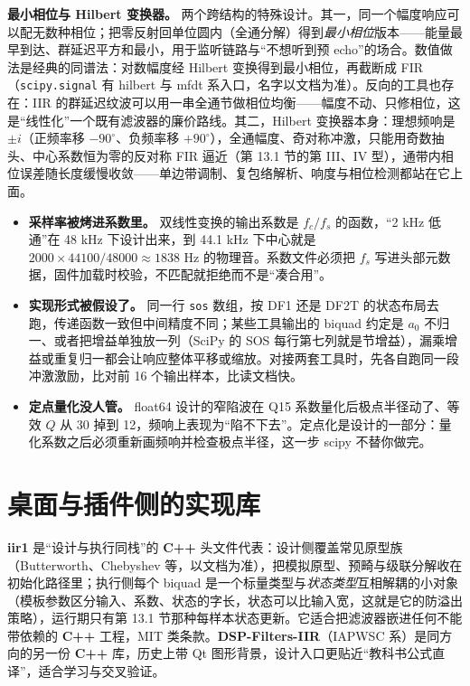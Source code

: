 \documentclass[12pt,a4paper,fontset=fandol]{ctexbook}
\newcommand{\Tp}[1]{\texttt{#1}}
\newcommand{\Lib}[1]{\textbf{#1}}
\newcommand{\Lang}[1]{\textsf{\bfseries #1}}
\newcommand{\CPP}{\Lang{C++}}
\begin{document}
\textbf{最小相位与 Hilbert 变换器。} 两个跨结构的特殊设计。其一，同一个幅度响应可以配无数种相位；把零反射回单位圆内（全通分解）得到\emph{最小相位}版本——能量最早到达、群延迟平方和最小，用于监听链路与``不想听到预 echo''的场合。数值做法是经典的同谱法：对数幅度经 Hilbert 变换得到最小相位，再截断成 FIR（\Tp{scipy.signal} 有 hilbert 与 mfdt 系入口，名字以文档为准）。反向的工具也存在：IIR 的群延迟纹波可以用一串全通节做相位均衡——幅度不动、只修相位，这是``线性化''一个既有滤波器的廉价路线。其二，Hilbert 变换器本身：理想频响是 $\pm i$（正频率移 $-90^\circ$、负频率移 $+90^\circ$），全通幅度、奇对称冲激，只能用奇数抽头、中心系数恒为零的反对称 FIR 逼近（第 13.1 节的第 III、IV 型），通带内相位误差随长度缓慢收敛——单边带调制、复包络解析、响度与相位检测都站在它上面。

\begin{note}[title={设计工具的输出不是实现系数}]
\begin{itemize}
\item \textbf{采样率被烤进系数里。} 双线性变换的输出系数是 $f_c / f_s$ 的函数，``2 kHz 低通''在 48 kHz 下设计出来，到 44.1 kHz 下中心就是 $2000 \times 44100/48000 \approx 1838$ Hz 的物理音。系数文件必须把 $f_s$ 写进头部元数据，固件加载时校验，不匹配就拒绝而不是``凑合用''。
\item \textbf{实现形式被假设了。} 同一行 \Tp{sos} 数组，按 DF1 还是 DF2T 的状态布局去跑，传递函数一致但中间精度不同；某些工具输出的 biquad 约定是 $a_0$ 不归一、或者把增益单独放一列（SciPy 的 SOS 每行第七列就是节增益），漏乘增益或重复归一都会让响应整体平移或缩放。对接两套工具时，先各自跑同一段冲激激励，比对前 16 个输出样本，比读文档快。
\item \textbf{定点量化没人管。} float64 设计的窄陷波在 Q15 系数量化后极点半径动了、等效 $Q$ 从 30 掉到 12，频响上表现为``陷不下去''。定点化是设计的一部分：量化系数之后必须重新画频响并检查极点半径，这一步 scipy 不替你做完。
\end{itemize}
\end{note}

\section{桌面与插件侧的实现库}

\Lib{iir1} 是``设计与执行同栈''的 \CPP{} 头文件代表：设计侧覆盖常见原型族（Butterworth、Chebyshev 等，以文档为准），把模拟原型、预畸与级联分解收在初始化路径里；执行侧每个 biquad 是一个标量类型与\emph{状态类型}互相解耦的小对象（模板参数区分输入、系数、状态的字长，状态可以比输入宽，这就是它的防溢出策略），运行期只有第 13.1 节那种每样本状态更新。它适合把滤波器嵌进任何不能带依赖的 \CPP{} 工程，MIT 类条款。\Lib{DSP-Filters-IIR}（IAPWSC 系）是同方向的另一份 \CPP{} 库，历史上带 Qt 图形背景，设计入口更贴近``教科书公式直译''，适合学习与交叉验证。
\end{document}
